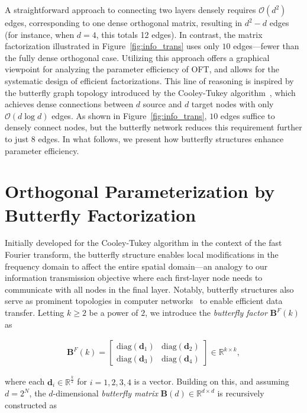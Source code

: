 A straightforward approach to connecting two layers densely requires $\mathcal{O}(d^2)$ edges, corresponding to one dense orthogonal matrix, resulting in $d^2-d$ edges (for instance, when $d=4$, this totals 12 edges). In contrast, the matrix factorization illustrated in Figure~\ref{fig:info_trans} uses only $10$ edges—fewer than the fully dense orthogonal case. Utilizing this approach offers a graphical viewpoint for analyzing the parameter efficiency of OFT, and allows for the systematic design of efficient factorizations. This line of reasoning is inspired by the butterfly graph topology introduced by the Cooley-Tukey algorithm~\cite{cooley1965algorithm}, which achieves dense connections between $d$ source and $d$ target nodes with only $\mathcal{O}(d\log d)$ edges. As shown in Figure~\ref{fig:info_trans}, $10$ edges suffice to densely connect nodes, but the butterfly network reduces this requirement further to just $8$ edges. In what follows, we present how butterfly structures enhance parameter efficiency.

\section{Orthogonal Parameterization by Butterfly Factorization}

Initially developed for the Cooley-Tukey algorithm in the context of the fast Fourier transform, the butterfly structure enables local modifications in the frequency domain to affect the entire spatial domain—an analogy to our information transmission objective where each first-layer node needs to communicate with all nodes in the final layer. Notably, butterfly structures also serve as prominent topologies in computer networks~\cite{solihin2015fundamentals,li2011linear} to enable efficient data transfer. Letting $k \geq 2$ be a power of $2$, we introduce the \emph{butterfly factor} $\bm{B}^F(k)$ as

\begin{equation}\label{eq:but_factor}
\begin{aligned}
    \bm{B}^F(k)=\begin{bmatrix}
    \text{diag}(\bm{d}_1) & \text{diag}(\bm{d}_2) \\
    \text{diag}(\bm{d}_3) & \text{diag}(\bm{d}_4)
    \end{bmatrix}\in\mathbb{R}^{k\times k},
\end{aligned}
\end{equation}

where each $\bm{d}_i\in\mathbb{R}^{\frac{k}{2}}$ for $i=1,2,3,4$ is a vector. Building on this, and assuming $d=2^N$, the $d$-dimensional \emph{butterfly matrix} $\bm{B}(d)\in\mathbb{R}^{d\times d}$ is recursively constructed as

